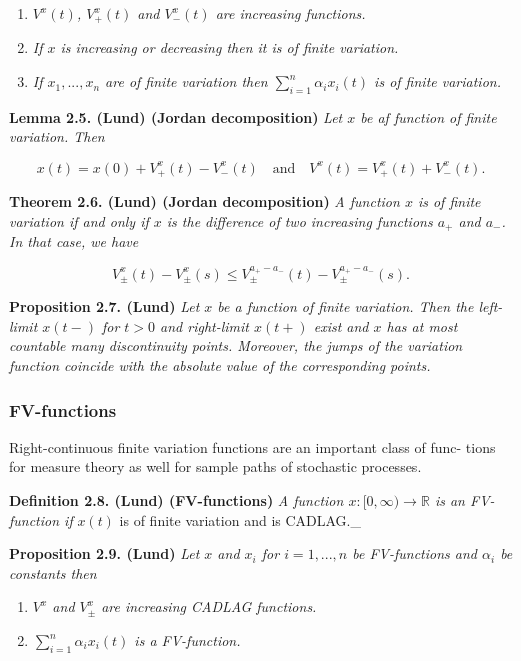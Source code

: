 \documentclass[a4paper,12pt,openany]{book}
\providecommand{\tightlist}{%
 \setlength{\itemsep}{0pt}\setlength{\parskip}{0pt}}
\begin{document}
\begin{enumerate}
\def\labelenumi{\roman{enumi})}
\tightlist
\item
  \emph{\(V^x(t)\), \(V^x_+(t)\) and \(V^x_-(t)\) are increasing functions.}
\item
  \emph{If \(x\) is increasing or decreasing then it is of finite variation.}
\item
  \emph{If \(x_1,...,x_n\) are of finite variation then \(\sum_{i=1}^n\alpha_ix_i(t)\) is of finite variation.}
\end{enumerate}

\textbf{Lemma 2.5. (Lund) (Jordan decomposition)} \emph{Let \(x\) be af function of finite variation. Then}

\[
x(t)=x(0)+V_+^x(t)-V_-^x(t)\quad\text{and}\quad V^x(t)=V_+^x(t)+V_-^x(t).
\]

\textbf{Theorem 2.6. (Lund) (Jordan decomposition)} \emph{A function \(x\) is of finite variation if and only if \(x\) is the difference of two increasing functions \(a_+\) and \(a_-\). In that case, we have}

\[
V_{\pm}^x(t)-V_{\pm}^x(s)\le V_{\pm}^{a_+-a_-}(t)-V_{\pm}^{a_+-a_-}(s).
\]

\textbf{Proposition 2.7. (Lund)} \emph{Let \(x\) be a function of finite variation. Then the left-limit \(x(t-)\) for \(t>0\) and right-limit \(x(t+)\) exist and \(x\) has at most countable many discontinuity points. Moreover, the jumps of the variation function coincide with the absolute value of the corresponding points.}

\hypertarget{fv-functions}{%
\subsubsection{FV-functions}\label{fv-functions}}

Right-continuous finite variation functions are an important class of func- tions for measure theory as well for sample paths of stochastic processes.

\textbf{Definition 2.8. (Lund) (FV-functions)} \emph{A function \(x : [0,\infty) \to \mathbb R\) is an FV-function if }\(x(t)\) is of finite variation and is CADLAG.\_

\textbf{Proposition 2.9. (Lund)} \emph{Let \(x\) and \(x_i\) for \(i=1,...,n\) be FV-functions and \(\alpha_i\) be constants then}

\begin{enumerate}
\def\labelenumi{\roman{enumi})}
\tightlist
\item
  \emph{\(V^x\) and \(V_\pm^x\) are increasing CADLAG functions.}
\item
  \emph{\(\sum_{i=1}^n \alpha_ix_i(t)\) is a FV-function.}
\end{enumerate}
\end{document}
